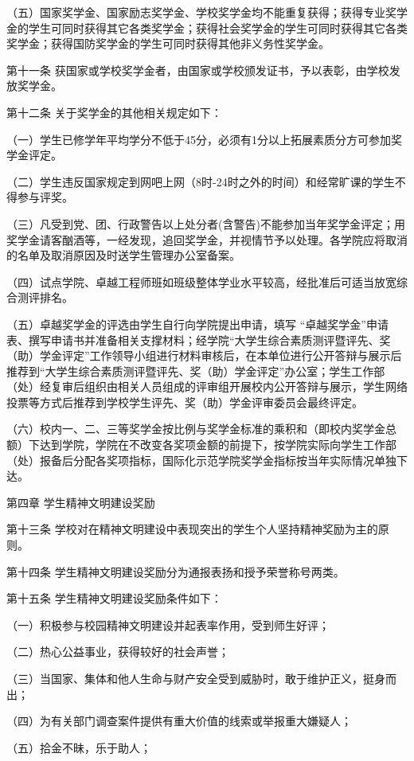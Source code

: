 \documentclass[UTF8,12pt,a4paper]{report}
\begin{document}
（五）国家奖学金、国家励志奖学金、学校奖学金均不能重复获得；获得专业奖学金的学生可同时获得其它各类奖学金；获得社会奖学金的学生可同时获得其它各类奖学金；获得国防奖学金的学生可同时获得其他非义务性奖学金。

第十一条  获国家或学校奖学金者，由国家或学校颁发证书，予以表彰，由学校发放奖学金。

第十二条  关于奖学金的其他相关规定如下：

（一）学生已修学年平均学分不低于45分，必须有1分以上拓展素质分方可参加奖学金评定。

（二）学生违反国家规定到网吧上网（8时-24时之外的时间）和经常旷课的学生不得参与评奖。

（三）凡受到党、团、行政警告以上处分者(含警告)不能参加当年奖学金评定；用奖学金请客酗酒等，一经发现，追回奖学金，并视情节予以处理。各学院应将取消的名单及取消原因及时送学生管理办公室备案。

（四）试点学院、卓越工程师班如班级整体学业水平较高，经批准后可适当放宽综合测评排名。

（五）卓越奖学金的评选由学生自行向学院提出申请，填写 “卓越奖学金”申请表、撰写申请书并准备相关支撑材料；经学院“大学生综合素质测评暨评先、奖（助）学金评定”工作领导小组进行材料审核后，在本单位进行公开答辩与展示后推荐到“大学生综合素质测评暨评先、奖（助）学金评定”办公室；学生工作部（处）经复审后组织由相关人员组成的评审组开展校内公开答辩与展示，学生网络投票等方式后推荐到学校学生评先、奖（助）学金评审委员会最终评定。

（六）校内一、二、三等奖学金按比例与奖学金标准的乘积和（即校内奖学金总额）下达到学院，学院在不改变各奖项金额的前提下，按学院实际向学生工作部（处）报备后分配各奖项指标，国际化示范学院奖学金指标按当年实际情况单独下达。



第四章  学生精神文明建设奖励

第十三条  学校对在精神文明建设中表现突出的学生个人坚持精神奖励为主的原则。

第十四条  学生精神文明建设奖励分为通报表扬和授予荣誉称号两类。

第十五条  学生精神文明建设奖励条件如下：

（一）积极参与校园精神文明建设并起表率作用，受到师生好评；

（二）热心公益事业，获得较好的社会声誉；

（三）当国家、集体和他人生命与财产安全受到威胁时，敢于维护正义，挺身而出；

（四）为有关部门调查案件提供有重大价值的线索或举报重大嫌疑人；

（五）拾金不昧，乐于助人；
\end{document}
